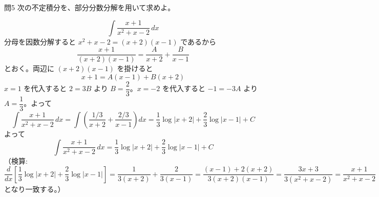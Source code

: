 \documentclass[a4paper,11pt]{article}
\begin{document}
\clearpage
\begin{mondaiboxS}{問5}
次の不定積分を、部分分数分解を用いて求めよ。
\end{mondaiboxS}
\[
\int \frac{x+1}{x^{2}+x-2} \, dx
\]
\kaitou
分母を因数分解すると $x^{2}+x-2 = (x+2)(x-1)$ であるから
\[
\frac{x+1}{(x+2)(x-1)} = \frac{A}{x+2} + \frac{B}{x-1}
\]
とおく。両辺に $(x+2)(x-1)$ を掛けると
\[
x+1 = A(x-1) + B(x+2)
\]
$x=1$ を代入すると $2 = 3B$ より $B = \dfrac{2}{3}$。$x=-2$ を代入すると $-1 = -3A$ より $A = \dfrac{1}{3}$。よって
\[
\int \frac{x+1}{x^{2}+x-2}\, dx = \int \left(\frac{1/3}{x+2} + \frac{2/3}{x-1}\right) dx = \frac{1}{3}\log|x+2| + \frac{2}{3}\log|x-1| + C
\]
よって
\[
\boxed{\; \int \frac{x+1}{x^{2}+x-2}\, dx = \frac{1}{3}\log|x+2| + \frac{2}{3}\log|x-1| + C \;}
\]
（検算: $\dfrac{d}{dx}\left[\dfrac{1}{3}\log|x+2| + \dfrac{2}{3}\log|x-1|\right] = \dfrac{1}{3(x+2)} + \dfrac{2}{3(x-1)} = \dfrac{(x-1) + 2(x+2)}{3(x+2)(x-1)} = \dfrac{3x+3}{3(x^{2}+x-2)} = \dfrac{x+1}{x^{2}+x-2}$ となり一致する。）
\end{document}
